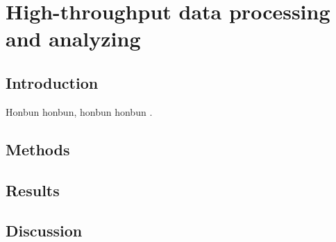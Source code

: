 \chapter{High-throughput data processing and analyzing}

\section{Introduction}

Honbun honbun, honbun honbun \citep{zhao_crop_2019}. 


\section{Methods}


\section{Results}

\section{Discussion}